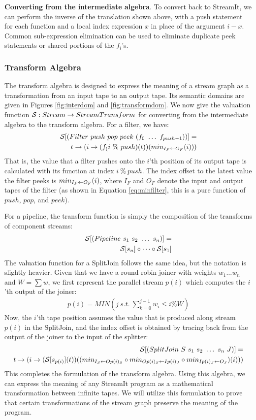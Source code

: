 {\bf Converting from the intermediate algebra}.  To convert back to
StreamIt, we can perform the inverse of the translation shown above,
with a push statement for each function and a local index expression
$x$ in place of the argument $i-x$.  Common sub-expression elimination
can be used to eliminate duplicate peek statements or shared portions
of the $f_i$'s.

\subsubsection{Transform Algebra}

The transform algebra is designed to express the meaning of a stream
graph as a transformation from an input tape to an output tape.  Its
semantic domains are given in Figures \ref{fig:interdom} and
\ref{fig:transformdom}.  We now give the valuation function ${\cal S}:
Stream \ra StreamTransform$ for converting from the intermediate
algebra to the transform algebra.  For a filter, we have:
\begin{align*}
{\cal S} [(Filter~push~pop~peek~(f_0~\dots~f_{push-1}))] = \\
t \ra (i \ra (f_(i~\%~push)(t))(\mi{I_F}{O_F}(i)))
\end{align*}
That is, the value that a filter pushes onto the $i$'th position of
its output tape is calculated with its function at index $i~\%~push$.
The index offset to the latest value the filter peeks is
$min_{I_F \leftarrow O_F}(i)$, where $I_F$ and $O_F$ denote the input and output
tapes of the filter (as shown in Equation \ref{eq:minfilter}, this is
a pure function of $push$, $pop$, and $peek$).

For a pipeline, the transform function is simply the composition of
the transforms of component streams:
\begin{align*}
{\cal S} [(Pipeline~s_1~s_2~\dots~s_n)] = \\
{\cal S}[s_n] \circ \dots \circ {\cal S}[s_1]
\end{align*}
The valuation function for a SplitJoin follows the same idea, but the
notation is slightly heavier.  Given that we have a round robin joiner
with weights $w_1 \dots w_n$ and $W = \sum{w}$, we first represent the
parallel stream $p(i)$ which computes the $i$'th output of the
joiner:
\begin{align}
\label{eq:p}
p(i) = MIN(j~s.t.~\sum_{k=0}^{j-1}{w_i} \le i\%W) 
\end{align}
Now, the $i$'th tape position assumes the value that is produced along
stream $p(i)$ in the SplitJoin, and the index offset is obtained by
tracing back from the output of the joiner to the input of the
splitter:
\begin{align*}
{\cal S} [(SplitJoin~S~s_1~s_2~\dots~s_n~J)] = \\
t \ra (i \ra ({\cal S}[s_{p(i)}](t))(
(\mi{I_S}{Op(i)_S} \circ \mi{Op(i)_S}{Ip(i)_J} \circ \mi{Ip(i)_J}{O_J})(i)))
\end{align*}
This completes the formulation of the transform algebra.  Using this
algebra, we can express the meaning of any StreamIt program as a
mathematical transformation between infinite tapes.  We will utilize
this formulation to prove that certain transformations of the stream
graph preserve the meaning of the program.

